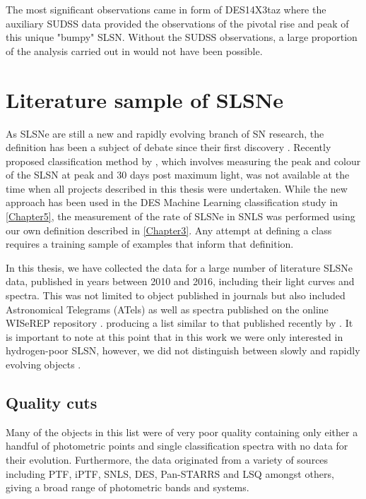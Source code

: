 The most significant observations came in form of DES14X3taz where the auxiliary SUDSS data provided the observations of the pivotal rise and peak of this unique "bumpy" SLSN. Without the SUDSS observations, a large proportion of the analysis carried out in \citep{Smith2016} would not have been possible.

\section{Literature sample of SLSNe}
As SLSNe are still a new and rapidly evolving branch of SN research, the definition has been a subject of debate since their first discovery \citep{Gal-Yam2012, Inserra2013, Nicholl2014}. Recently proposed classification method by \citet{Inserra2018}, which involves measuring the peak and colour of the SLSN at peak and 30 days post maximum light, was not available at the time when all projects described in this thesis were undertaken. While the new approach has been used in the DES Machine Learning classification study in \cref{Chapter5}, the measurement of the rate of SLSNe in SNLS was performed using our own definition described in \cref{Chapter3}. Any attempt at defining a class requires a training sample of examples that inform that definition.

In this thesis, we have collected the data for a large number of literature SLSNe data, published in years between 2010 and 2016, including their light curves and spectra. This was not limited to object published in journals but also included Astronomical Telegrams (ATels) as well as spectra published on the online WISeREP repository \citep{Yaron2012}. producing a list similar to that published recently by \citet{Schulze2017}. It is important to note at this point that in this work we were only interested in hydrogen-poor SLSN, however, we did not distinguish between slowly and rapidly evolving objects \citep{Gal-Yam2012, Inserra2013}.

\subsection{Quality cuts}
Many of the objects in this list were of very poor quality containing only either a handful of photometric points and single classification spectra with no data for their evolution. Furthermore, the data originated from a variety of sources including PTF, iPTF, SNLS, DES, Pan-STARRS and LSQ amongst others, giving a broad range of photometric bands and systems.

